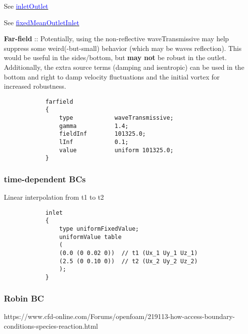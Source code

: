 \documentclass[a4paper, 12pt]{article}
\numberwithin{equation}{section}
\newcommand{\code}{\fontfamily{pcr}\selectfont}
\newcommand{\blue}[1]{\textcolor{blue}{#1}}
\begin{document}
            See \href{
            https://doc.openfoam.com/2306/tools/processing/boundary-conditions/rtm/derived/inletOutlet/inletOutlet/
            }{\blue{inletOutlet}}

            See \href{
            https://doc.openfoam.com/2306/tools/processing/boundary-conditions/rtm/derived/inletOutlet/fixedMeanOutletInlet/
            }{\blue{fixedMeanOutletInlet}}

            \textbf{Far-field} :: Potentially, using the non-reflective {\code waveTransmissive} may help suppress some weird(-but-small) behavior (which may be waves reflection). This would be useful in the sides/bottom, but \textbf{may not} be robust in the outlet. Additionally, the extra source terms (damping and isentropic) can be used in the bottom and right to damp velocity fluctuations and the initial vortex for increased robustness.

            {
            \begin{verbatim}
            farfield
            {
                type            waveTransmissive;
                gamma           1.4;
                fieldInf        101325.0;
                lInf            0.1;
                value           uniform 101325.0;
            }
            \end{verbatim}
            }

        \subsubsection{time-dependent BCs}

            Linear interpolation from t1 to t2

            {
            \begin{verbatim}
            inlet
            {
                type uniformFixedValue;
                uniformValue table
                (
                (0.0 (0 0.02 0))  // t1 (Ux_1 Uy_1 Uz_1)
                (2.5 (0 0.10 0))  // t2 (Ux_2 Uy_2 Uz_2)
                );
            }
            \end{verbatim}
            }

        \subsubsection{Robin BC}

            https://www.cfd-online.com/Forums/openfoam/219113-how-access-boundary-conditions-species-reaction.html
\end{document}
